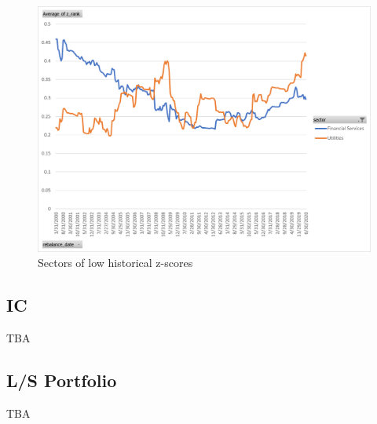 \documentclass[11pt]{article} %
\begin{document}
\begin{itemize}
\begin{figure}[H]
\centering
\includegraphics[scale=0.7]{pb_z_score_sector_low.png}
\caption{Sectors of low historical z-scores}
\label{fig:pb_z_low}
\end{figure}

\end{itemize}

\subsection{IC}
TBA


\subsection{L/S Portfolio}
TBA
\end{document}
